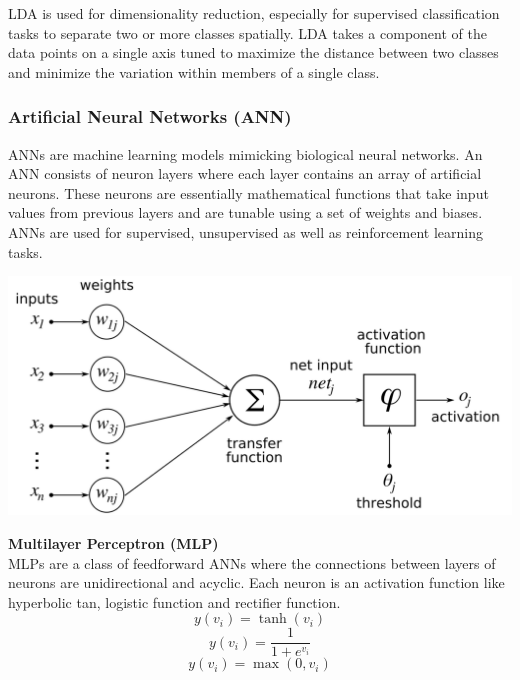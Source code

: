 \documentclass[a4paper, 12pt]{article}
\begin{document}
\noindent LDA is used for dimensionality reduction, especially for supervised classification tasks to separate two or more classes spatially. LDA takes a component of the data points on a single axis tuned to maximize the distance between two classes and minimize the variation within members of a single class.

\vskip 0.2in
\subsubsection{Artificial Neural Networks (ANN)}

\noindent ANNs are machine learning models mimicking biological neural networks. An ANN consists of neuron layers where each layer contains an array of artificial neurons. These neurons are essentially mathematical functions that take input values from previous layers and are tunable using a set of weights and biases. ANNs are used for supervised, unsupervised as well as reinforcement learning tasks.

\begin{center}
\includegraphics[scale=0.38]{ann.png}
\label{fig:ann}
\end{center}

\vskip 0.2in
\noindent\textbf{Multilayer Perceptron (MLP)} \\
\noindent MLPs are a class of feedforward ANNs where the connections between layers of neurons are unidirectional and acyclic. Each neuron is an activation function like hyperbolic tan, logistic function and rectifier function.
\begin{equation}
    y(v_i) = \tanh(v_i)
\end{equation}
\begin{equation}
    y(v_i) = \frac{1}{1 + e^{v_i}}
\end{equation}
\begin{equation}
    y(v_i) = \max(0, v_i)
\end{equation}
\end{document}
